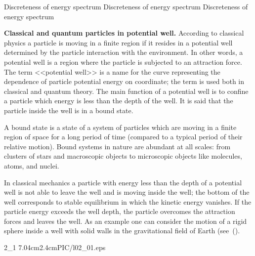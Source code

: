 
\let\theEquation=\oldTheEquation
\let\theFigure=\oldTheFigure

\Chapter
{Discreteness of energy spectrum}
{Discreteness of energy spectrum}
{Discreteness of energy spectrum}

\textbf{Classical and quantum particles in potential well.}  According to classical physics a particle is moving in a finite region if it resides in a potential well determined by the particle interaction with the environment. In other words, a potential well is a region where the particle is subjected to an attraction force. The term <<potential well>> is a name for the curve representing the dependence of particle potential energy on coordinate; the term is used both in classical and quantum theory. The main function of a potential well is to confine a particle which energy is less than the depth of the well. It is said that the particle inside the well is in a bound state.

A bound state is a state of a system of particles which are moving in a finite region of space for a long period of time (compared to a typical period of their relative motion). Bound systems in nature are abundant at all scales: from clusters of stars and macroscopic objects to microscopic objects like molecules, atoms, and nuclei.

In classical mechanics a particle with energy less than the depth of a potential well is not able to leave the well and is moving inside the well; the bottom of the well corresponds to stable equilibrium in which the kinetic energy vanishes. If the particle energy exceeds the well depth, the particle overcomes the attraction forces and leaves the well. As an example one can consider the motion of a rigid sphere inside a well with solid walls in the gravitational field of Earth (see~().

2_1 {7.04cm}{2.4cm}{PIC/l02_01.eps}

